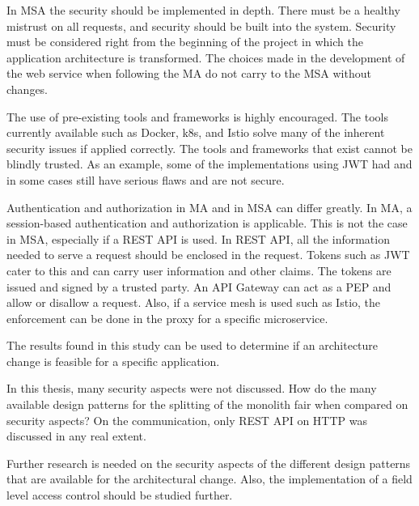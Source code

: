 \begin{sloppypar}
    In MSA the security should be implemented in depth. There must be a healthy
    mistrust on all requests, and security should be built into the system.
    Security must be considered right from the beginning of the project in which
    the application architecture is transformed. The choices made in the
    development of the web service when following the MA do not carry to the MSA
    without changes.
\end{sloppypar}
\begin{sloppypar}
    The use of pre-existing tools and frameworks is highly encouraged. The tools
    currently available such as Docker, k8s, and Istio solve many of the
    inherent security issues if applied correctly. The tools and frameworks that
    exist cannot be blindly trusted. As an example, some of the implementations
    using JWT had and in some cases still have serious flaws and are not secure.
\end{sloppypar}
\begin{sloppypar}
    Authentication and authorization in MA and in MSA can differ greatly. In MA,
    a session-based authentication and authorization is applicable. This is not
    the case in MSA, especially if a REST API is used. In REST API, all the
    information needed to serve a request should be enclosed in the request.
    Tokens such as JWT cater to this and can carry user information and other
    claims. The tokens are issued and signed by a trusted party. An API Gateway
    can act as a PEP and allow or disallow a request. Also, if a service mesh is
    used such as Istio, the enforcement can be done in the proxy for a specific
    microservice.
\end{sloppypar}
\begin{sloppypar}
    The results found in this study can be used to determine if an
    architecture change is feasible for a specific application.
\end{sloppypar}
\begin{sloppypar}
    In this thesis, many security aspects were not discussed. How do the many
    available design patterns for the splitting of the monolith fair when
    compared on security aspects? On the communication, only REST API on HTTP was
    discussed in any real extent.
\end{sloppypar}
\begin{sloppypar}
    Further research is needed on the security aspects of the different design
    patterns that are available for the architectural change. Also, the
    implementation of a field level access control should be studied further.
\end{sloppypar}

